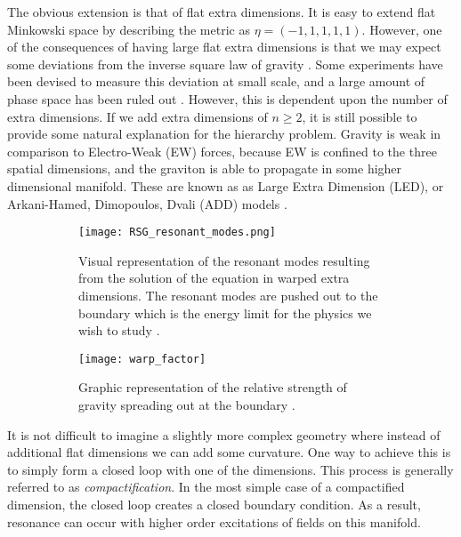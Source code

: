 \documentclass[12pt]{article}
\begin{document}
The obvious extension is that of flat extra dimensions. It is easy to extend
flat Minkowski space by describing the metric as $\eta = (-1,1,1,1,1)$. However,
one of the consequences of having large flat extra dimensions is that we may
expect some deviations from the inverse square law of gravity \cite{bsm}. Some
experiments have been devised to measure this deviation at small scale, and a
large amount of phase space has been ruled out \cite{bsm}. However, this is
dependent upon the number of extra dimensions. If we add extra dimensions of
$n\geq 2$, it is still possible to provide some natural explanation for the
hierarchy problem. Gravity is weak in comparison to Electro-Weak (EW) forces,
because EW is confined to the three spatial dimensions, and the graviton is able
to propagate in some higher dimensional manifold. These are known as as Large
Extra Dimension (LED), or Arkani-Hamed, Dimopoulos, Dvali (ADD) models
\cite{Arkani_Hamed_1998, Arkani_Hamed_1999}. 

\begin{figure}[t]
    \centering
    \begin{subfigure}[t]{.48\textwidth}
        \centering
        \texttt{[image: RSG\_resonant\_modes.png]}
        \caption{Visual representation of the resonant modes resulting from the
        solution of the equation in warped extra dimensions. The resonant modes
        are pushed out to the boundary which is the energy limit for the physics we
        wish to study \cite{bsm}.}
        \label{subfig:RSG_resonant_modes}
    \end{subfigure}
    \hfill
    \begin{subfigure}[t]{.48\textwidth}
        \centering
        \texttt{[image: warp\_factor]}
        \caption{Graphic representation of the relative strength of gravity
        spreading out at the boundary \cite{bsm}.}
        \label{subfig:warp_factor}
    \end{subfigure}
\caption{}
\label{fig:theoretical_motivation_figure}
\end{figure}

It is not difficult to imagine a slightly more complex geometry where instead of
additional flat dimensions we can add some curvature. One way to achieve this is
to simply form a closed loop with one of the dimensions. This process is
generally referred to as \textit{compactification}. In the most simple case of a
compactified dimension, the closed loop creates a closed boundary condition. As
a result, resonance can occur with higher order excitations of fields on this
manifold. 
\end{document}
